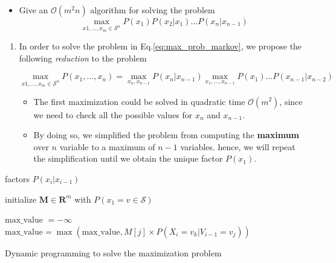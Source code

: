 \documentclass[10pt]{article}
\begin{document}
\begin{itemize}
  \item Give an $\mathcal{O}(m^2n)$ algorithm for solving the problem
\begin{equation}
  \label{eq:max_prob_markov}
  \max_{x1,\ldots,x_m \in \mathcal{S}^n} P(x_1) P(x_2|x_1)\ldots P(x_n|x_{n-1})
  \end{equation}
  \end{itemize}
\begin{enumerate}[label=(\alph*)]
  \item In order to solve the problem in Eq.\ref{eq:max_prob_markov}, we propose
    the following \emph{reduction} to the problem
   
\begin{equation}
  \max_{x1,\ldots,x_m \in \mathcal{S}^n} P(x_1,\ldots,x_n) = \max_{x_n, x_{n-1}} P(x_n|x_{n-1})\max_{x_1,\ldots,x_{n-1}} P(x_1)\ldots P(x_{n-1}| x_{n-2})
  \end{equation}

\begin{itemize}
  \item The first maximization could be solved in quadratic time
    $\mathcal{O}(m^2)$, since we need to check all the possible values for $x_n$
    and $x_{n-1}$.
   \item By doing so, we simplified the problem from computing the
     \textbf{maximum} over $n$ variable to a maximum of $n-1$ variables. hence,
     we will repeat the simplification until we obtain the unique factor $P(x_1)$.
\end{itemize}
\end{enumerate}
\begin{algorithm}[H]
  \begin{algorithmic}
    \REQUIRE factors $P(x_i|x_{i-1})$

    \STATE initialize $\mathbf{M}\in \mathbf{R}^m$ with $P(x_1= v\in\mathcal{S})$


    \STATE $\text{max\_value } = -\infty$
    \STATE $\text{max\_value} = \max(\text{max\_value}, M[j]\times P(X_i=v_k|V_{i-1}=v_j))$
    \ENDFOR
    \ENDFOR

    \ENDFOR
    
    \end{algorithmic}
  \caption{Dynamic programming to solve the maximization problem}
  \end{algorithm}
\end{document}
